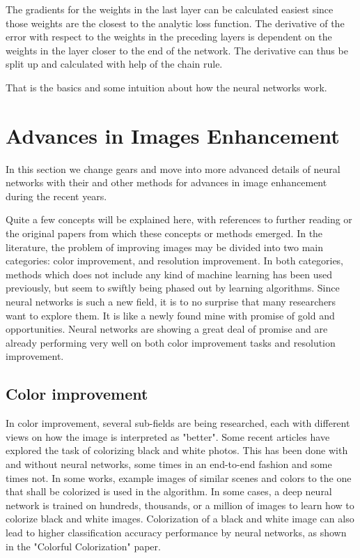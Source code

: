 The gradients for the weights in the last layer can be calculated easiest since those weights are the closest to the analytic loss function. The derivative of the error with respect to the weights in the preceding layers is dependent on the weights in the layer closer to the end of the network. The derivative can thus be split up and calculated with help of the chain rule.  

That is the basics and some intuition about how the neural networks work. 

\section{Advances in Images Enhancement}
In this section we change gears and move into more advanced details of neural networks with their and other methods for advances in image enhancement during the recent years.

Quite a few concepts will be explained here, with references to further reading or the original papers from which these concepts or methods emerged. In the literature, the problem of improving images may be divided into two main categories: color improvement, and resolution improvement. In both categories, methods which does not include any kind of machine learning has been used previously, but seem to swiftly being phased out by learning algorithms. Since neural networks is such a new field, it is to no surprise that many researchers want to explore them. It is like a newly found mine with promise of gold and opportunities. Neural networks are showing a great deal of promise and are already  performing very well on both color improvement tasks and resolution improvement. 


\subsection{Color improvement}
In color improvement, several sub-fields are being researched, each with different views on how the image is interpreted as "better". Some recent articles have explored the task of colorizing black and white photos. This has been done with and without neural networks, some times in an end-to-end fashion and some times not. In some works, example images of similar scenes and colors to the one that shall be colorized is used in the algorithm. In some cases, a deep neural network is trained on hundreds, thousands, or a million of images to learn how to colorize black and white images. Colorization of a black and white image can also lead to higher classification accuracy performance by neural networks, as shown in the "Colorful Colorization" paper. 

